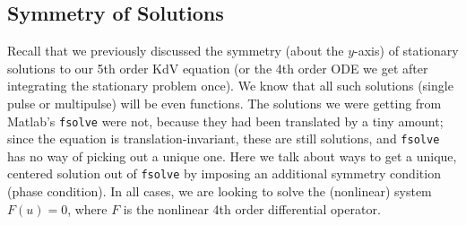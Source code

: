 \documentclass[12pt]{article}
\begin{document}
\subsection*{Symmetry of Solutions}
Recall that we previously discussed the symmetry (about the $y$-axis) of stationary solutions to our 5th order KdV equation (or the 4th order ODE we get after integrating the stationary problem once). We know that all such solutions (single pulse or multipulse) will be even functions. The solutions we were getting from Matlab's \texttt{fsolve} were not, because they had been translated by a tiny amount; since the equation is translation-invariant, these are still solutions, and \texttt{fsolve} has no way of picking out a unique one. Here we talk about ways to get a unique, centered solution out of \texttt{fsolve} by imposing an additional symmetry condition (phase condition). In all cases, we are looking to solve the (nonlinear) system $F(u) = 0$, where $F$ is the nonlinear 4th order differential operator.
\end{document}
